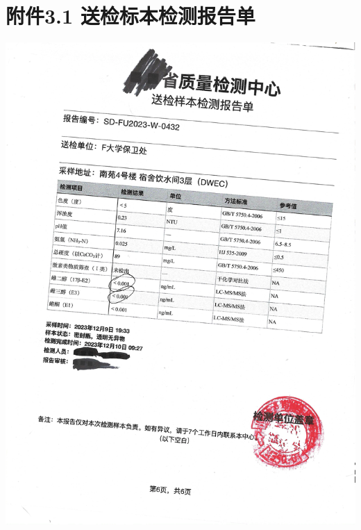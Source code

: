 \documentclass[]{ctexrep}
\begin{document}
	\section*{附件3.1 送检标本检测报告单}
	\label{附件3.1}
	\includegraphics[scale=0.6]{./附件3.1.png}
	
\end{document}
